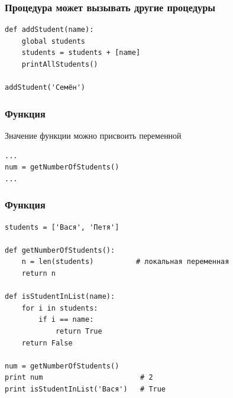 {\begin{frame}[fragile]
  \frametitle{Процедура может вызывать другие процедуры}
  \begin{verbatim}
def addStudent(name):
    global students
    students = students + [name]
    printAllStudents()

addStudent('Семён')
  \end{verbatim}
\end{frame}

\begin{frame}[fragile]
  \frametitle{Функция}
  Значение функции можно присвоить переменной

  \vspace{1cm}
  \begin{verbatim}
...
num = getNumberOfStudents()
...
  \end{verbatim}
\end{frame}

\begin{frame}[fragile]
  \frametitle{Функция}
  \begin{verbatim}
students = ['Вася', 'Петя']

def getNumberOfStudents():
    n = len(students)          # локальная переменная
    return n

def isStudentInList(name):
    for i in students:
        if i == name:
            return True
    return False

num = getNumberOfStudents()
print num                       # 2
print isStudentInList('Вася')   # True
  \end{verbatim}
\end{frame}



    }
